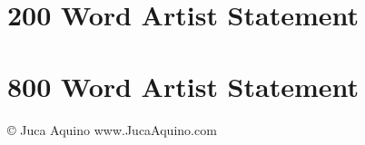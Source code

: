 \documentclass[10pt]{article}
\begin{document}
\section*{200 Word Artist Statement} 
\section*{800 Word Artist Statement} 

\vspace*{\fill}

\copyright{} \the\year{} Juca Aquino \hfill www.JucaAquino.com
\end{document}
